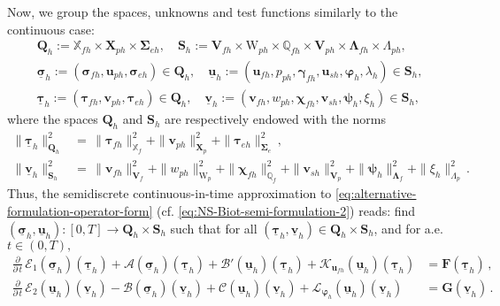 \documentclass[11pt]{article}
\numberwithin{equation}{section}
\newcommand{\ds}{\displaystyle}
\newcommand{\bgamma}{{\boldsymbol\gamma}}
\newcommand{\bLambda}{{\boldsymbol\Lambda}}
\newcommand{\bsi}{{\boldsymbol\sigma}}
\newcommand{\bSigma}{{\boldsymbol\Sigma}}
\newcommand{\bvarphi}{{\boldsymbol\varphi}}
\newcommand{\bpsi}{{\boldsymbol\psi}}
\newcommand{\btau}{{\boldsymbol\tau}}
\newcommand{\bchi}{{\boldsymbol\chi}}
\newcommand{\ubsi}{\underline{\bsi}}
\newcommand{\ubtau}{\underline{\btau}}
\newcommand{\ubu}{\underline{\bu}}
\newcommand{\ubv}{\underline{\bv}}
\newcommand{\bv}{{\mathbf{v}}}
\newcommand{\bu}{\mathbf{u}}
\newcommand{\0}{{\mathbf{0}}}
\def\bF{\mathbf{F}}
\def\bG{\mathbf{G}}
\def\bX{\mathbf{X}}
\def\bV{\mathbf{V}}
\def\bQ{\mathbf{Q}}
\def\bS{\mathbf{S}}
\newcommand\bbQ{\mathbb{Q}}
\newcommand\bbX{\mathbb{X}}
\newcommand{\cA}{\mathcal{A}}
\newcommand{\cB}{\mathcal{B}}
\newcommand{\cC}{\mathcal{C}}
\newcommand{\cE}{\mathcal{E}}
\newcommand{\cK}{\mathcal{K}}
\newcommand{\cL}{\mathcal{L}}
\def\W{\mathrm{W}}
\numberwithin{equation}{section}
\begin{document}
Now, we group the spaces, unknowns and test functions similarly to the continuous case:
\begin{equation*}
\begin{array}{c}
\ds \bQ_h := \bbX_{fh}\times \bX_{ph}\times \bSigma_{eh},\quad
\bS_h := \bV_{fh}\times \W_{ph}\times \bbQ_{fh}\times \bV_{ph}\times \bLambda_{fh}\times \Lambda_{ph}, \\ [1.5ex]
\ds \ubsi_h := (\bsi_{fh}, \bu_{ph}, \bsi_{eh})\in \bQ_h,\quad 
\ubu_h := (\bu_{fh}, p_{ph}, \bgamma_{fh}, \bu_{sh}, \bvarphi_{h}, \lambda_{h})\in \bS_h, \\[1ex]
\ds \ubtau_h := (\btau_{fh}, \bv_{ph}, \btau_{eh})\in \bQ_h,\quad 
\ubv_h := (\bv_{fh}, w_{ph}, \bchi_{fh}, \bv_{sh}, \bpsi_{h}, \xi_{h})\in \bS_h,
\end{array}
\end{equation*}
%
where the spaces $\bQ_h$ and $\bS_h$ are respectively endowed with the norms
\begin{equation*}
\begin{array}{ll}
\|\ubtau_h\|^2_{\bQ_h} & = \, \|\btau_{fh}\|^2_{\bbX_{f}} + \|\bv_{ph}\|^2_{\bX_{p}}+ \|\btau_{eh}\|^2_{\bSigma_{e}}\,, \\[1ex]
\|\ubv_h\|^2_{\bS_h} & = \, \|\bv_{fh}\|^2_{\bV_{f}} + \|w_{ph}\|^2_{\W_{p}} + \|\bchi_{fh}\|^2_{\bbQ_{f}} + \|\bv_{sh}\|^2_{\bV_{p}} + \|\bpsi_{h}\|^2_{\bLambda_{f}} + \|\xi_{h}\|^2_{\Lambda_{p}}\,.
\end{array}
\end{equation*}
Thus, the semidiscrete continuous-in-time approximation to \eqref{eq:alternative-formulation-operator-form} (cf. \eqref{eq:NS-Biot-semi-formulation-2}) reads: find $(\ubsi_{h},\ubu_{h}): [0,T]\to \bQ_{h}\times \bS_{h}$ such that for all $(\ubtau_h,\ubv_{h}) \in \bQ_{h}\times \bS_{h}$, and for a.e. $t\in (0,T),$
\begin{align}
\frac{\partial}{\partial\,t}\,\cE_1(\ubsi_{h})(\ubtau_{h}) + \cA(\ubsi_{h})(\ubtau_{h}) + \cB'(\ubu_{h})(\ubtau_{h}) + \cK_{\bu_{fh}}(\ubu_{h})(\ubtau_{h}) &= \bF(\ubtau_{h})\,, \nonumber\\ 
\frac{\partial}{\partial\,t}\,\cE_2(\ubu_{h})(\ubv_{h}) - \cB(\ubsi_{h})(\ubv_{h}) + \cC(\ubu_{h})(\ubv_{h})+\cL_{\bvarphi_{h}}(\ubu_{h})(\ubv_{h}) &= \bG(\ubv_{h})\,.
\label{eq:alternative-discrete-formulation-operator-form}
\end{align}
\end{document}
